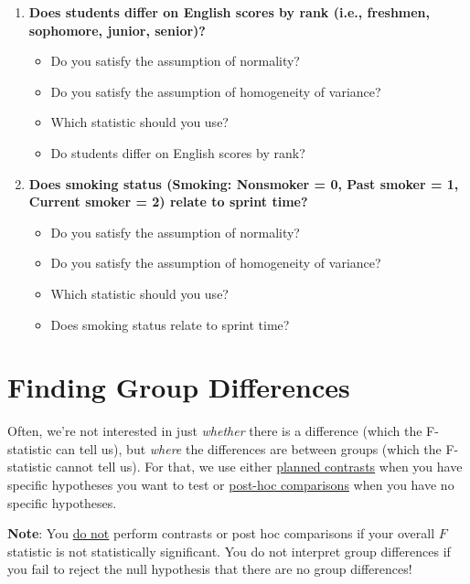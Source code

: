\documentclass[
]{book}
\begin{document}
\begin{enumerate}
\def\labelenumi{\arabic{enumi}.}
\item
  \textbf{Does students differ on English scores by rank (i.e., freshmen, sophomore, junior, senior)?}

  \begin{itemize}
  \item
    Do you satisfy the assumption of normality?
  \item
    Do you satisfy the assumption of homogeneity of variance?
  \item
    Which statistic should you use?
  \item
    Do students differ on English scores by rank?
  \end{itemize}
\item
  \textbf{Does smoking status (Smoking: Nonsmoker = 0, Past smoker = 1, Current smoker = 2) relate to sprint time?}

  \begin{itemize}
  \item
    Do you satisfy the assumption of normality?
  \item
    Do you satisfy the assumption of homogeneity of variance?
  \item
    Which statistic should you use?
  \item
    Does smoking status relate to sprint time?
  \end{itemize}
\end{enumerate}

\hypertarget{finding-group-differences}{%
\section{Finding Group Differences}\label{finding-group-differences}}

Often, we're not interested in just \emph{whether} there is a difference (which the F-statistic can tell us), but \emph{where} the differences are between groups (which the F-statistic cannot tell us). For that, we use either \underline{planned contrasts} when you have specific hypotheses you want to test or \underline{post-hoc comparisons} when you have no specific hypotheses.

\textbf{Note}: You \underline{do not} perform contrasts or post hoc comparisons if your overall \(F\) statistic is not statistically significant. You do not interpret group differences if you fail to reject the null hypothesis that there are no group differences!
\end{document}
